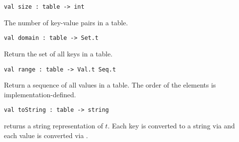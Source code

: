 \begin{cluster}
\label{grp:grm:aug-ordtable-interface::size}

\begin{gram}[size]
\label{grm:aug-ordtable-interface::size}
\begin{verbatim}
val size : table -> int
\end{verbatim}
The number of key-value pairs in a table.

\end{gram}
\end{cluster}

\begin{cluster}
\label{grp:grm:aug-ordtable-interface::domain}

\begin{gram}[domain]
\label{grm:aug-ordtable-interface::domain}
\begin{verbatim}
val domain : table -> Set.t
\end{verbatim}
Return the set of all keys in a table.

\end{gram}
\end{cluster}

\begin{cluster}
\label{grp:grm:aug-ordtable-interface::range}

\begin{gram}[range]
\label{grm:aug-ordtable-interface::range}
\begin{verbatim}
val range : table -> Val.t Seq.t
\end{verbatim}
Return a sequence of all values in a table. The order of the elements is
implementation-defined.

\end{gram}
\end{cluster}

\begin{cluster}
\label{grp:grm:aug-ordtable-interface::tostring}

\begin{gram}[toString]
\label{grm:aug-ordtable-interface::tostring}
\begin{verbatim}
val toString : table -> string
\end{verbatim}
 returns a string representation of $t$. Each key is converted
to a string via  and each value is converted via
.

\end{gram}
\end{cluster}

